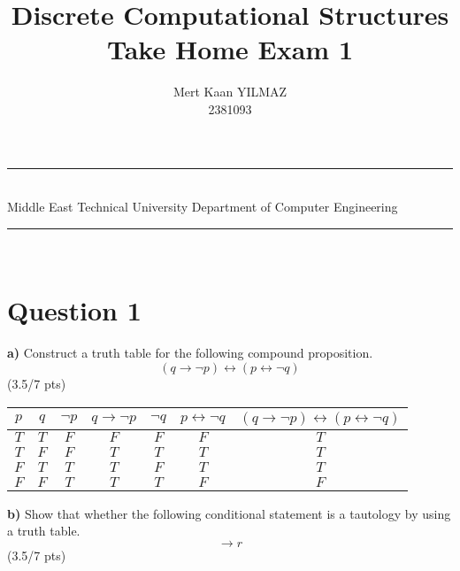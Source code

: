 \documentclass[a4paper,12pt]{article}
\title{Discrete Computational Structures \\ Take Home Exam 1}
\author{Mert Kaan YILMAZ \\ 2381093} %
\date{} %
\newcommand{\HRule}{\rule{\linewidth}{1mm}}
\newcommand\tab[1][1cm]{\hspace*{#1}}
\begin{document}
\HRule\\
Middle East Technical University \hfill Department of Computer Engineering
{\let\newpage\relax\maketitle}
\HRule\\
\vspace{1cm}


\newpage
\section*{Question 1 \hfill {}}

\tab \textbf{a)} Construct a truth table for the following compound proposition.
\begin{equation*}
    (q \rightarrow \neg p)\leftrightarrow (p \leftrightarrow \neg q)
\end{equation*} 
\hfill \small{(3.5/7 pts)} \\

\begin{tcolorbox}
    \centering
    \begin{tabular}{|c c|c|c|c|c|c|}
        $p$ & $q$ & $\lnot p$ & $q \rightarrow \lnot p$ & $\lnot q$ & $p \leftrightarrow \lnot q$ & $(q \rightarrow \lnot p) \leftrightarrow (p \leftrightarrow \lnot q)$\\
        \hline
        $T$ & $T$ & $F$ & $F$ & $F$ & $F$ & $T$\\
        $T$ & $F$ & $F$ & $T$ & $T$ & $T$ & $T$\\
        $F$ & $T$ & $T$ & $T$ & $F$ & $T$ & $T$\\
        $F$ & $F$ & $T$ & $T$ & $T$ & $F$ & $F$\\
    \end{tabular}

\end{tcolorbox}

\tab \textbf{b)} Show that whether the following conditional statement is a tautology by using a truth table.
\begin{equation*}
    [(p \vee q) \wedge (r \rightarrow p) \wedge (r \rightarrow q)] \rightarrow r
\end{equation*}
\hfill \small{(3.5/7 pts)}\\
\end{document}
